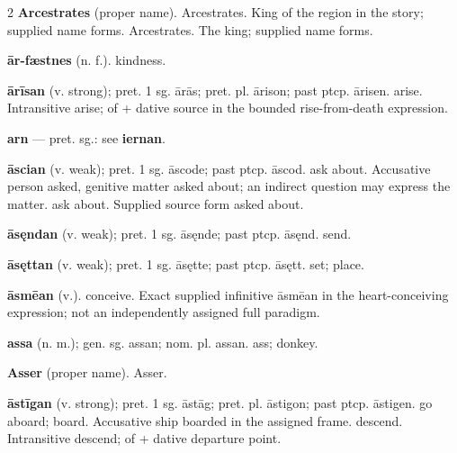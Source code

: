 \begin{multicols*}{2}
\textbf{Arcestrates} (proper name). Arcestrates. King of the region in the story; supplied name forms. Arcestrates. The king; supplied name forms.\par
\textbf{ār-fæstnes} (n. f.). kindness.\par
\textbf{ārīsan} (v. strong); pret. 1 sg. ārās; pret. pl. ārison; past ptcp. ārisen. arise. Intransitive arise; of + dative source in the bounded rise-from-death expression.\par
\textbf{arn} — pret. sg.: see \textbf{iernan}.\par
\textbf{āscian} (v. weak); pret. 1 sg. āscode; past ptcp. āscod. ask about. Accusative person asked, genitive matter asked about; an indirect question may express the matter. ask about. Supplied source form asked about.\par
\textbf{āsęndan} (v. weak); pret. 1 sg. āsęnde; past ptcp. āsęnd. send.\par
\textbf{āsęttan} (v. weak); pret. 1 sg. āsętte; past ptcp. āsętt. set; place.\par
\textbf{āsmēan} (v.). conceive. Exact supplied infinitive āsmēan in the heart-conceiving expression; not an independently assigned full paradigm.\par
\textbf{assa} (n. m.); gen. sg. assan; nom. pl. assan. ass; donkey.\par
\textbf{Asser} (proper name). Asser.\par
\textbf{āstīgan} (v. strong); pret. 1 sg. āstāg; pret. pl. āstigon; past ptcp. āstigen. go aboard; board. Accusative ship boarded in the assigned frame. descend. Intransitive descend; of + dative departure point.\par

\end{multicols*}
